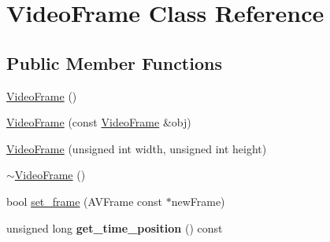 \hypertarget{classVideoFrame}{}\section{Video\+Frame Class Reference}
\label{classVideoFrame}
\subsection*{Public Member Functions}
\begin{DoxyCompactItemize}
\item 
\hyperlink{classVideoFrame_ae66f6b32cc93690f42ef8e2d35c6f435}{Video\+Frame} ()
\item 
\hyperlink{classVideoFrame_af5d39a4dcb1e62a1e706b940712d1205}{Video\+Frame} (const \hyperlink{classVideoFrame}{Video\+Frame} \&obj)
\item 
\hyperlink{classVideoFrame_afe4186defd8bbe6613ee5fb105a4f72d}{Video\+Frame} (unsigned int width, unsigned int height)
\item 
\hyperlink{classVideoFrame_af3b566c39ee5878c602581cb1f196675}{$\sim$\+Video\+Frame} ()
\item 
bool \hyperlink{classVideoFrame_a3e5610d8ab84404681fd803b18a158bb}{set\+\_\+frame} (A\+V\+Frame const $\ast$new\+Frame)
\item 
\hypertarget{classVideoFrame_a037a6f6e039413290206427d6fa2c25b}{}unsigned long {\bfseries get\+\_\+time\+\_\+position} () const \label{classVideoFrame_a037a6f6e039413290206427d6fa2c25b}


\end{DoxyCompactItemize}
